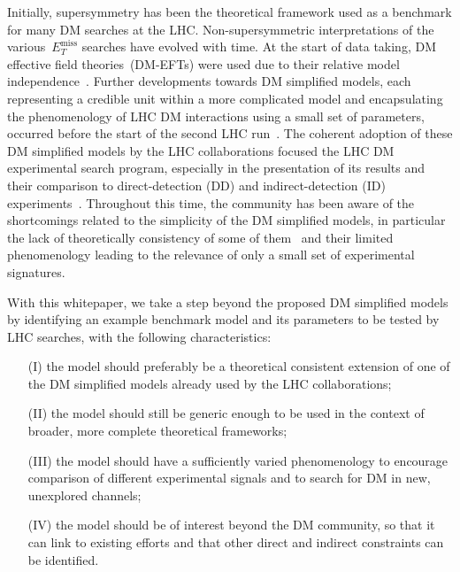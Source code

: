 \documentclass[a4paper, 11pt,notoc]{article}
\newcommand{\MET}{\ensuremath{E_T^\mathrm{miss}}\xspace}
\begin{document}
Initially, supersymmetry has been the theoretical framework used as a benchmark for many DM searches at the LHC.  Non-supersymmetric interpretations of the various~$\MET$ searches have  evolved with time. {\color{red} At the start of data taking, DM effective field theories~(DM-EFTs)  were used due to their relative model independence~\cite{Cao:2009uw,Beltran:2010ww,Goodman:2010yf,Bai:2010hh,Goodman:2010ku,Fox:2011pm}.}  Further developments towards DM simplified models, each representing a credible unit within a more complicated model and  encapsulating the phenomenology of LHC DM interactions using a small set of parameters, occurred before  the start of the second LHC run~\cite{Abdallah:2015ter,Abercrombie:2015wmb}.  The coherent adoption of these DM simplified models by the LHC collaborations focused the LHC DM experimental search program, especially in the presentation of its results and their comparison to direct-detection (DD) and indirect-detection (ID) experiments~\cite{Boveia:2016mrp,Albert:2017onk}. {\color{magenta} Throughout this time, the community has been aware of the shortcomings related to the simplicity of the DM simplified models, in particular the lack of theoretically consistency of some of them~\cite{Chala:2015ama,Bell:2015sza,Kahlhoefer:2015bea,Bell:2015rdw,Haisch:2016usn,Englert:2016joy,Ko:2016zxg} and their limited phenomenology leading to the relevance of only a small set of experimental signatures.  }

With this whitepaper, we take a step beyond the proposed DM simplified models by identifying an example benchmark model and its parameters to be tested by LHC searches, with the following characteristics: 
\begin{itemize}
\item[(I)] the model should preferably be a theoretical consistent extension of one of the DM simplified models already used by the LHC collaborations;
\item[(II)] the model should still be generic enough to be used in the context of broader, more complete theoretical frameworks;  
\item[(III)] the model should have a sufficiently varied phenomenology to encourage comparison of different experimental signals and to search for DM in new, unexplored channels;
\item[(IV)] the model should be of interest beyond the DM community, so that it can link to existing efforts and that other direct and indirect constraints can be identified.
\end{itemize}
\end{document}
